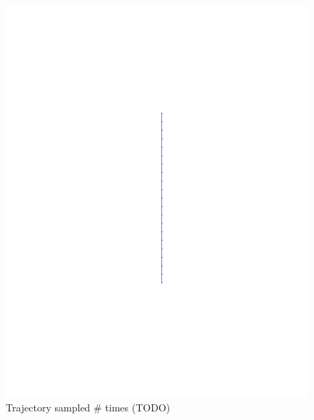 \begin{figure}
  \centering
  \begin{minipage}[b]{0.4\textwidth}
    \includegraphics[width=\textwidth]{figures/method/trajectory-sampled}
    \caption{Trajectory sampled \# times (TODO)}
  \end{minipage}
  \hfill
  \begin{minipage}[b]{0.4\textwidth}

\end{minipage}
\end{figure}
